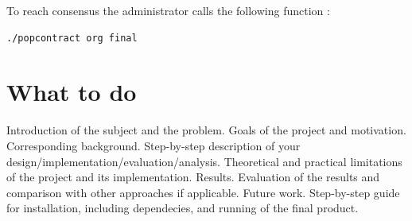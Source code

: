 \documentclass[11pt, a4paper, twoside, openright]{book} %
\begin{document}
To reach consensus the administrator calls the following function :
\begin{lstlisting}
./popcontract org final
\end{lstlisting}











 


\section{What to do}


Introduction of the subject and the problem.
Goals of the project and motivation.
Corresponding background.
Step-by-step description of your design/implementation/evaluation/analysis.
Theoretical and practical limitations of the project and its implementation.
Results.
Evaluation of the results and comparison with other approaches if applicable.
Future work.
Step-by-step guide for installation, including dependecies, and running of the final product.







\tableofcontents
\end{document}
